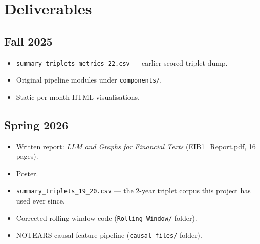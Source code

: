 \documentclass[11pt]{article}
\begin{document}
\section{Deliverables}

\subsection{Fall 2025}
\begin{itemize}
  \item \texttt{summary\_triplets\_metrics\_22.csv} --- earlier scored triplet dump.
  \item Original pipeline modules under \texttt{components/}.
  \item Static per-month HTML visualisations.
\end{itemize}

\subsection{Spring 2026}
\begin{itemize}
  \item Written report: \emph{LLM and Graphs for Financial Texts} (EIB1\_Report.pdf, 16 pages).
  \item Poster.
  \item \texttt{summary\_triplets\_19\_20.csv} --- the 2-year triplet corpus this project has used ever since.
  \item Corrected rolling-window code (\texttt{Rolling Window/} folder).
  \item NOTEARS causal feature pipeline (\texttt{causal\_files/} folder).
\end{itemize}
\end{document}
